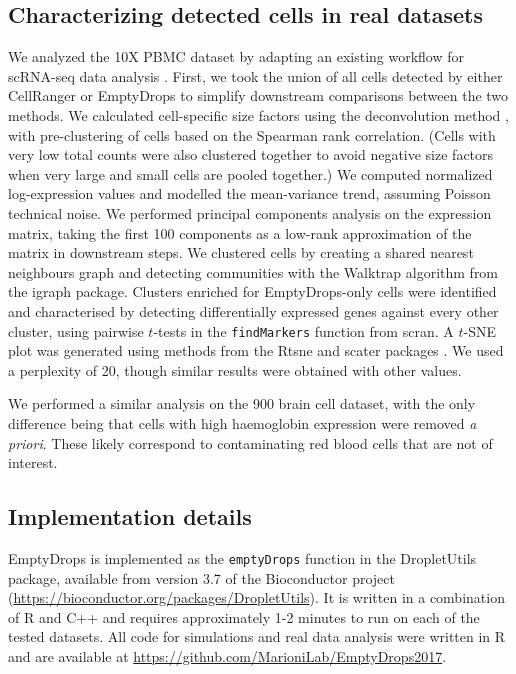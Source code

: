 \documentclass[10pt,letterpaper]{article}
\newcommand{\code}[1]{\texttt{#1}}
\begin{document}
\subsection*{Characterizing detected cells in real datasets}
We analyzed the 10X PBMC dataset by adapting an existing workflow for scRNA-seq data analysis \cite{lun2016stepbystep}.
First, we took the union of all cells detected by either CellRanger or EmptyDrops to simplify downstream comparisons between the two methods.
We calculated cell-specific size factors using the deconvolution method \cite{lun2016pooling}, with pre-clustering of cells based on the Spearman rank correlation.
(Cells with very low total counts were also clustered together to avoid negative size factors when very large and small cells are pooled together.)
We computed normalized log-expression values and modelled the mean-variance trend, assuming Poisson technical noise.
We performed principal components analysis on the expression matrix, taking the first 100 components as a low-rank approximation of the matrix in downstream steps.
We clustered cells by creating a shared nearest neighbours graph \cite{xu2015identification} and detecting communities with the Walktrap algorithm from the \textsf{igraph} package.
Clusters enriched for EmptyDrops-only cells were identified and characterised by detecting differentially expressed genes against every other cluster,
using pairwise $t$-tests in the \code{findMarkers} function from \textsf{scran}.
A $t$-SNE plot \cite{van2008visualizing} was generated using methods from the \textsf{Rtsne} and \textsf{scater} packages \cite{mccarthy2017scater}.
We used a perplexity of 20, though similar results were obtained with other values.

We performed a similar analysis on the 900 brain cell dataset, with the only difference being that cells with high haemoglobin expression were removed \textit{a priori}.
These likely correspond to contaminating red blood cells that are not of interest.

\subsection*{Implementation details}
EmptyDrops is implemented as the \code{emptyDrops} function in the \textsf{DropletUtils} package, available from version 3.7 of the Bioconductor project (\url{https://bioconductor.org/packages/DropletUtils}).
It is written in a combination of R and C++ and requires approximately 1-2 minutes to run on each of the tested datasets.
All code for simulations and real data analysis were written in R and are available at \url{https://github.com/MarioniLab/EmptyDrops2017}.
\end{document}
